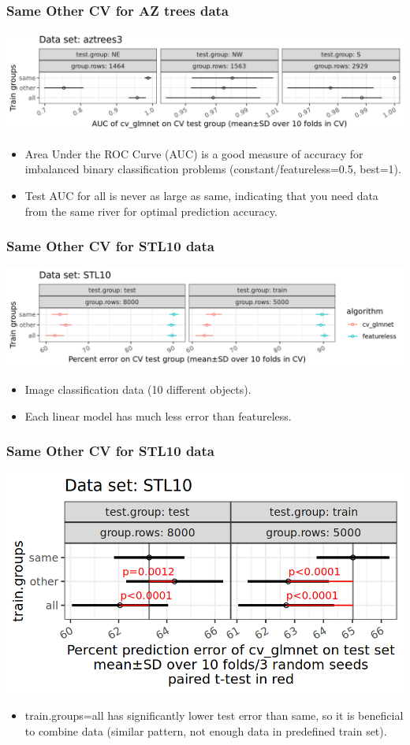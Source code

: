 \documentclass{beamer}
\begin{document}
\begin{frame}
  \frametitle{Same Other CV for AZ trees data}
  \includegraphics[width=\textwidth]{AZtrees3_AUC_glmnet_mean_SD.png}
  \begin{itemize}
  \item Area Under the ROC Curve (AUC) is a good measure of accuracy
    for imbalanced binary classification problems (constant/featureless=0.5, best=1).
  \item Test AUC for all is never as large as same, indicating that
    you need data from the same river for optimal prediction accuracy.
  \end{itemize}
\end{frame}

\begin{frame}[fragile]
  \frametitle{Same Other CV for STL10 data}
  \includegraphics[width=\textwidth]{STL10_error_glmnet_featureless_mean_SD.png}
  \begin{itemize}
  \item Image classification data (10 different objects).
  \item Each linear model has much less error than featureless.
  \end{itemize}
\end{frame}

\begin{frame}
  \frametitle{Same Other CV for STL10 data}
  \includegraphics[width=\textwidth]{STL10_error_glmnet_sizes_mean_SD_pvalue.png}
  \begin{itemize}
  \item train.groups=all has significantly
    lower test error than same, so it is beneficial to combine data
    (similar pattern, not enough data in predefined train set).
  \end{itemize}
\end{frame}
\end{document}
